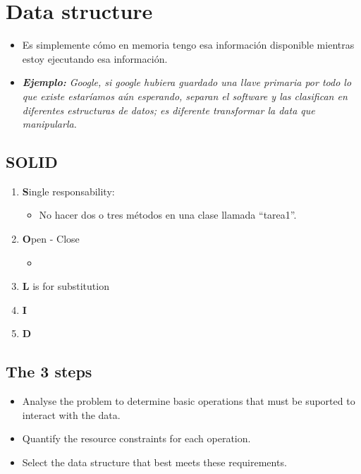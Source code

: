 \section{Data structure}
\begin{itemize}
    \item Es simplemente cómo en memoria tengo esa información disponible mientras estoy ejecutando esa información.
    \item \emph{\textbf{Ejemplo: }Google, si google hubiera guardado una llave primaria por todo lo que existe estaríamos aún esperando, separan el software y las clasifican en diferentes estructuras de datos; es diferente transformar la data que manipularla. }
\end{itemize}


\subsection{SOLID}
\begin{enumerate}
    \item \textbf{S}ingle responsability:
        \begin{itemize}
            \item No hacer dos o tres métodos en una clase llamada ``tarea1''.
        \end{itemize}
    
    \item \textbf{O}pen - Close 
        \begin{itemize}
            \item 
        \end{itemize}
    
    \item \textbf{L} is for substitution 
    \item \textbf{I}
    \item \textbf{D}
\end{enumerate}


\subsection{The 3 steps}
\begin{itemize}
    \item Analyse the problem to determine basic operations that must be suported to interact with the data.
    \item Quantify the resource constraints for each operation.
    \item Select the data structure that best meets these requirements.
\end{itemize}

